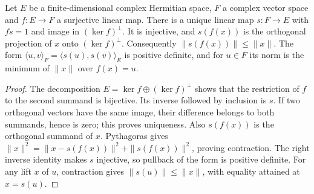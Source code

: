 \begin{lemma}
\label{lem:orthogonal-lift}
\leanok
Let $E$ be a finite-dimensional complex Hermitian space, $F$ a complex
vector space and $f:E\to F$ a surjective linear map. There is a unique
linear map $s:F\to E$ with $fs=1$ and image in $(\ker f)^\perp$.
It is injective, and $s(f(x))$ is the orthogonal projection of $x$
onto $(\ker f)^\perp$. Consequently $\|s(f(x))\|\leq\|x\|$.
The form $\langle u,v\rangle_F=\langle s(u),s(v)\rangle_E$ is
positive definite, and for $u\in F$ its norm is the minimum of
$\|x\|$ over $f(x)=u$.
\end{lemma}
\begin{proof}
The decomposition $E=\ker f\oplus(\ker f)^\perp$ shows that the
restriction of $f$ to the second summand is bijective. Its inverse
followed by inclusion is $s$. If two orthogonal vectors have the same
image, their difference belongs to both summands, hence is zero;
this proves uniqueness. Also $s(f(x))$ is the orthogonal summand of
$x$. Pythagoras gives
$\|x\|^2=\|x-s(f(x))\|^2+\|s(f(x))\|^2$, proving contraction.
The right inverse identity makes $s$ injective, so pullback of the
form is positive definite. For any lift $x$ of $u$, contraction gives
$\|s(u)\|\leq\|x\|$, with equality attained at $x=s(u)$.
\end{proof}

